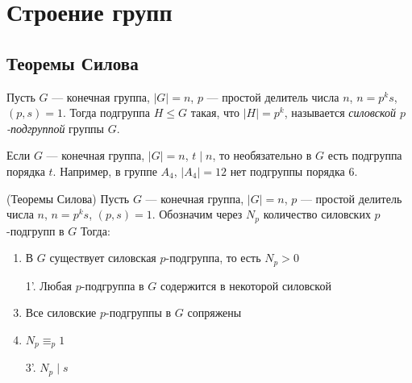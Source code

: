 \section{Строение групп}

\subsection{Теоремы Силова}

\begin{definition}
	Пусть $G$ --- конечная группа, $|G| = n$, $p$ --- простой делитель числа $n$, $n = p^ks$, $(p, s) = 1$. Тогда подгруппа $H \le G$ такая, что $|H| = p^k$, называется \textit{силовской $p$-подгруппой} группы $G$.
\end{definition}

\begin{note}
	Если $G$ --- конечная группа, $|G| = n$, $t \mid n$, то необязательно в $G$ есть подгруппа порядка $t$. Например, в группе $A_4$, $|A_4| = 12$ нет подгруппы порядка 6.
\end{note}

\begin{theorem} (Теоремы Силова)
	Пусть $G$ --- конечная группа, $|G| = n$, $p$ --- простой делитель числа $n$, $n = p^ks$, $(p, s) = 1$. Обозначим через $N_p$ количество силовских $p$-подгрупп в $G$ Тогда:
	\begin{enumerate}[align=left, leftmargin=15pt]
		\item В $G$ существует силовская $p$-подгруппа, то есть $N_p > 0$
		\item[1'.] Любая $p$-подгруппа в $G$ содержится в некоторой силовской
		\item Все силовские $p$-подгруппы в $G$ сопряжены
		\item $N_p \equiv_p 1$
		\item[3'.] $N_p \mid s$
	\end{enumerate}
\end{theorem}

